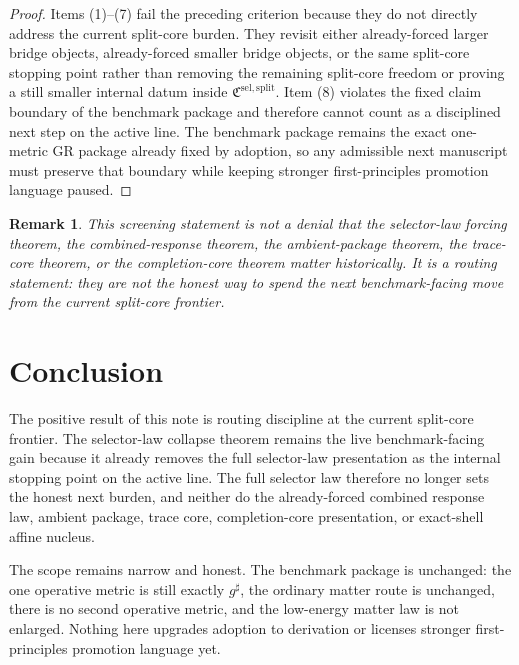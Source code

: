 \documentclass[11pt]{article}
\newcommand{\CompletedMetric}{g^{\sharp}}
\newcommand{\SelectorCore}{\mathfrak C^{\mathrm{sel,split}}}
\newtheorem{remark}{Remark}
\begin{document}
\begin{proof}
Items (1)--(7) fail the preceding criterion because they do not directly address the current split-core burden. They revisit either already-forced larger bridge objects, already-forced smaller bridge objects, or the same split-core stopping point rather than removing the remaining split-core freedom or proving a still smaller internal datum inside \(\SelectorCore\). Item (8) violates the fixed claim boundary of the benchmark package and therefore cannot count as a disciplined next step on the active line. The benchmark package remains the exact one-metric GR package already fixed by adoption, so any admissible next manuscript must preserve that boundary while keeping stronger first-principles promotion language paused.
\end{proof}

\begin{remark}
This screening statement is not a denial that the selector-law forcing theorem, the combined-response theorem, the ambient-package theorem, the trace-core theorem, or the completion-core theorem matter historically. It is a routing statement: they are not the honest way to spend the next benchmark-facing move from the current split-core frontier.
\end{remark}

\section{Conclusion}

The positive result of this note is routing discipline at the current split-core frontier. The selector-law collapse theorem remains the live benchmark-facing gain because it already removes the full selector-law presentation as the internal stopping point on the active line. The full selector law therefore no longer sets the honest next burden, and neither do the already-forced combined response law, ambient package, trace core, completion-core presentation, or exact-shell affine nucleus.

The scope remains narrow and honest. The benchmark package is unchanged: the one operative metric is still exactly \(\CompletedMetric\), the ordinary matter route is unchanged, there is no second operative metric, and the low-energy matter law is not enlarged. Nothing here upgrades adoption to derivation or licenses stronger first-principles promotion language yet.
\end{document}
